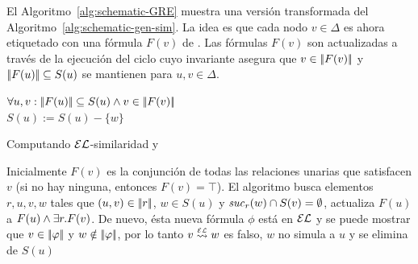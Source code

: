 El Algoritmo~\ref{alg:schematic-GRE} muestra una versi\'on transformada del 
Algoritmo~\ref{alg:schematic-gen-sim}. La idea es que cada nodo
$v\in\Delta$ es ahora etiquetado con una f\'ormula
$F(v)$ de \EL. Las f\'ormulas $F(v)$ son actualizadas a trav\'es de la ejecuci\'on del ciclo cuyo invariante asegura que $v \in
|\!|F(v)|\!|$ y $|\!|F(u)|\!| \subseteq S(u)$ se mantienen para
$u,v\in\Delta$.\\

%
%
%
%


\begin{algorithm}\small
{}
\io


\While{\guard}
{
  $\forall u,v: |\!|F(u)|\!| \subseteq S(u)\wedge v \in |\!|F(v)|\!|$\\
$S(u):=S(u)-\{w\}$ \label{alg:line:loop-body-begin}

} \caption{\small
Computando $\mathcal{EL}$-similaridad y \posre}\label{alg:schematic-GRE}
\end{algorithm}

Inicialmente $F(v)$ es la conjunci\'on de todas las relaciones unarias que
satisfacen $v$ (si no hay ninguna, entonces $F(v)=\top$).
El algoritmo busca elementos $r,u,v,w$ tales que
$(u,v)\in|\!|r|\!|$, $w\in S(u)$ y ${\it suc}_{r}(w)\cap
S(v)=\emptyset$, actualiza $F(u)$ a $F(u)\wedge\exists r. F(v)$.
De nuevo, \'esta nueva f\'ormula $\phi$ est\'a en $\mathcal{EL}$ y se puede mostrar que
$v\in|\!|\varphi|\!|$ y $w\notin|\!|\varphi|\!|$, por lo tanto $v\simil{\EL} w$ es falso, $w$ no simula a $u$ y se elimina de $S(u)$

